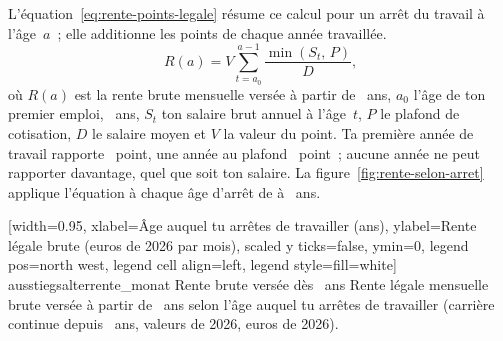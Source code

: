 
L'\'equation~\eqref{eq:rente-points-legale} r\'esume ce calcul pour un arr\^et du travail \`a
l'\^age~$a$~; elle additionne les points de chaque ann\'ee travaill\'ee.
\begin{equation}
  R(a) = V \sum_{t=a_0}^{a-1} \frac{\min(S_t,\,P)}{D} \text{,} \label{eq:rente-points-legale}
\end{equation}
o\`u $R(a)$ est la rente brute mensuelle vers\'ee \`a partir de \AgeLegal~ans, $a_0$ l'\^age de ton
premier emploi, \AgeDebutCotisation~ans, $S_t$ ton salaire brut annuel \`a l'\^age~$t$, $P$ le
plafond de cotisation, $D$ le salaire moyen et $V$ la valeur du point. Ta premi\`ere ann\'ee de
travail rapporte \PointsEntree~point, une ann\'ee au plafond \PointsPlafond~point~; aucune ann\'ee ne
peut rapporter davantage, quel que soit ton salaire. La figure~\ref{fig:rente-selon-arret} applique
l'\'equation \`a chaque \^age d'arr\^et de \RenteAgeMinGraphique{} \`a \AgeLegal~ans.

[width=0.95\linewidth, xlabel={\^Age auquel tu arr\^etes de travailler (ans)},
  ylabel={Rente l\'egale brute (euros de 2026 par mois)}, scaled y ticks=false, ymin=0,
  legend pos=north west, legend cell align=left, legend style={fill=white}]%
  {ausstiegsalter}{rente_monat}%
  {{Rente brute vers\'ee d\`es \AgeLegal~ans}}%
  {Rente l\'egale mensuelle brute vers\'ee \`a partir de \AgeLegal~ans selon l'\^age auquel tu arr\^etes
  de travailler (carri\`ere continue depuis \AgeDebutCotisation~ans, valeurs de 2026, euros de
  2026).\label{fig:rente-selon-arret}}

